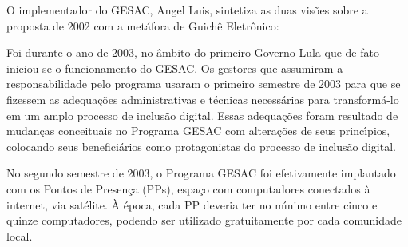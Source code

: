 \documentclass[
12pt,		%
openright,	%
twoside,  %
a4paper,			%
chapter=TITLE,		%
english,			%
french,				%
spanish,			%
brazil				%
]{USPSC-classe/USPSC}
\begin{document}
O implementador do GESAC, Angel Luis, sintetiza as duas vis\~oes sobre a proposta de 2002 com a met\'afora de \textquotedbl Guich\^e Eletr\^onico\textquotedbl :


















\noindent\begin{center}\mbox{\centering{}}\end{center}


Foi durante o ano de 2003, no \^ambito do primeiro Governo Lula que de fato iniciou-se o funcionamento do  GESAC. Os gestores que assumiram a responsabilidade pelo programa usaram o primeiro semestre de 2003 para que se fizessem as adequa\c{c}\~oes administrativas e t\'ecnicas necess\'arias para transform\'a-lo em um amplo processo de inclus\~ao digital. Essas adequa\c{c}\~oes foram resultado de mudan\c{c}as conceituais no Programa GESAC com altera\c{c}\~oes de seus princ\'{\i}pios, colocando seus benefici\'arios como protagonistas do processo de inclus\~ao digital.

















No segundo semestre de 2003, o Programa GESAC foi efetivamente implantado com os Pontos de Presen\c{c}a (PPs), espa\c{c}o com  computadores conectados \`a internet, via sat\'elite. \`A \'epoca, cada PP deveria ter no m\'{\i}nimo entre cinco e quinze computadores, podendo ser utilizado gratuitamente por cada comunidade local.
\end{document}
